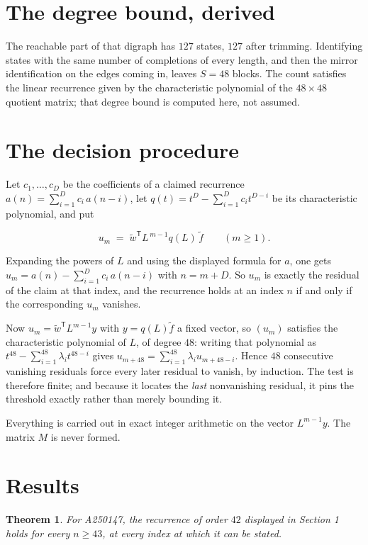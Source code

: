 \documentclass[11pt]{article}
\newtheorem{theorem}{Theorem}
\theoremstyle{definition}
\begin{document}
\section{The degree bound, derived}

The reachable part of that digraph has $127$ states, $127$ after trimming. Identifying states with the same number of completions of every length, and then the mirror identification on the edges coming in, leaves $S = 48$ blocks. The count satisfies the linear recurrence given by the characteristic polynomial of the $48\times48$ quotient matrix; that degree bound is computed here, not assumed.

\section{The decision procedure}

Let $c_1,\dots,c_D$ be the coefficients of a claimed recurrence $a(n) = \sum_{i=1}^{D} c_i\,a(n-i)$, let $q(t) = t^{D} - \sum_{i=1}^{D} c_i t^{D-i}$ be its characteristic polynomial, and put

\[u_m \;=\; \tilde w^{\mathsf T} L^{\,m-1} q(L)\,\tilde f \qquad (m \ge 1).\]

Expanding the powers of $L$ and using the displayed formula for $a$, one gets $u_m = a(n) - \sum_{i=1}^{D} c_i\,a(n-i)$ with $n = m + D$. So $u_m$ is exactly the residual of the claim at that index, and the recurrence holds at an index $n$ if and only if the corresponding $u_m$ vanishes.

Now $u_m = \tilde w^{\mathsf T} L^{m-1} y$ with $y = q(L)\tilde f$ a fixed vector, so $(u_m)$ satisfies the characteristic polynomial of $L$, of degree $48$: writing that polynomial as $t^{48} - \sum_{i=1}^{48} \lambda_i t^{48-i}$ gives $u_{m+48} = \sum_{i=1}^{48} \lambda_i u_{m+48-i}$. Hence $48$ consecutive vanishing residuals force every later residual to vanish, by induction. The test is therefore finite; and because it locates the {\itshape last} nonvanishing residual, it pins the threshold exactly rather than merely bounding it.

Everything is carried out in exact integer arithmetic on the vector $L^{m-1}y$. The matrix $M$ is never formed.

\section{Results}

\begin{theorem} For A250147, the recurrence of order $42$ displayed in Section 1 holds for every $n \ge 43$, at every index at which it can be stated.\end{theorem}
\end{document}
